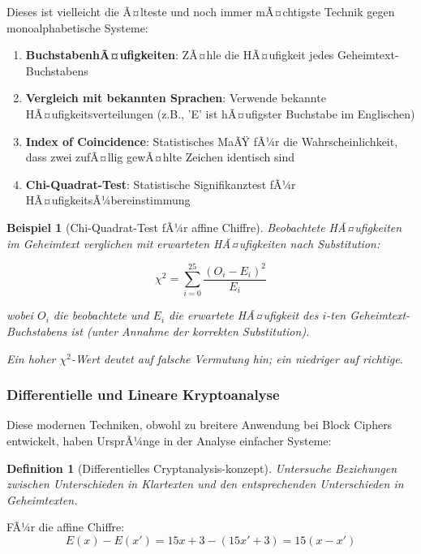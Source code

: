 ﻿\documentclass[12pt,a4paper]{article}
\newtheorem{definition}{Definition}
\newtheorem{example}{Beispiel}
\begin{document}
	Dieses ist vielleicht die Ã¤lteste und noch immer mÃ¤chtigste Technik gegen monoalphabetische Systeme:
	
	\begin{enumerate}
		\item \textbf{BuchstabenhÃ¤ufigkeiten}: ZÃ¤hle die HÃ¤ufigkeit jedes Geheimtext-Buchstabens
		\item \textbf{Vergleich mit bekannten Sprachen}: Verwende bekannte HÃ¤ufigkeitsverteilungen (z.B., 'E' ist hÃ¤ufigster Buchstabe im Englischen)
		\item \textbf{Index of Coincidence}: Statistisches MaÃŸ fÃ¼r die Wahrscheinlichkeit, dass zwei zufÃ¤llig gewÃ¤hlte Zeichen identisch sind
		\item \textbf{Chi-Quadrat-Test}: Statistische Signifikanztest fÃ¼r HÃ¤ufigkeitsÃ¼bereinstimmung
	\end{enumerate}
	
	\begin{example}[Chi-Quadrat-Test fÃ¼r affine Chiffre]
		Beobachtete HÃ¤ufigkeiten im Geheimtext verglichen mit erwarteten HÃ¤ufigkeiten nach Substitution:
		
		\begin{equation}
			\chi^2 = \sum_{i=0}^{25} \frac{(O_i - E_i)^2}{E_i}
		\end{equation}
		
		wobei $O_i$ die beobachtete und $E_i$ die erwartete HÃ¤ufigkeit des $i$-ten Geheimtext-Buchsta\-bens ist (unter Annahme der korrekten Substitution).
		
		Ein hoher $\chi^2$-Wert deutet auf falsche Vermutung hin; ein niedriger auf richtige.
	\end{example}
	
	\subsubsection{Differentielle und Lineare Kryptoanalyse}
	
	Diese modernen Techniken, obwohl zu breitere Anwendung bei Block Ciphers entwickelt, haben UrsprÃ¼nge in der Analyse einfacher Systeme:
	
	\begin{definition}[Differentielles Cryptanalysis-konzept]
		Untersuche Beziehungen zwischen Unterschieden in Klartexten und den entsprechenden Unterschieden in Geheimtexten.
	\end{definition}
	
	FÃ¼r die affine Chiffre:
	\begin{equation}
		E(x) - E(x') = 15x + 3 - (15x' + 3) = 15(x - x')
	\end{equation}
	
\end{document}
